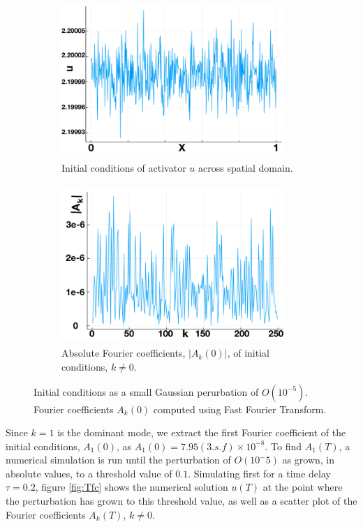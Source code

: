 \documentclass[12pt]{report}
\begin{document}
\begin{figure}[H]
    \centering
    \begin{subfigure}[b]{0.45\textwidth}
        \centering
        \includegraphics[width=8.5cm,height=6cm]{uic.png}
        \caption{Initial conditions of activator $u$ across spatial domain.}
        \label{}
    \end{subfigure}
    \hfill
    \begin{subfigure}[b]{0.45\textwidth}
        \centering
        \includegraphics[width=8.5cm,height=6cm]{uicfc.png}
        \caption{Absolute Fourier coefficients, $|A_k(0)|$, of initial conditions, $k\neq0$.}
        \label{fig:}
    \end{subfigure}
    \caption{Initial conditions as a small Gaussian perurbation of $O(10^{-5})$. Fourier coefficients $A_k(0)$ computed using Fast Fourier Transform.}
    \label{fig:icfc}
\end{figure}
Since $k=1$ is the dominant mode, we extract the first Fourier coefficient of the initial conditions, $A_1(0)$, as $A_1(0)=7.95(3.s.f)\times10^{-8}$. To find $A_1(T)$, a numerical simulation is run until the perturbation of $O(10^-5)$ as grown, in absolute values, to a threshold value of $0.1$. Simulating first for a time delay $\tau=0.2$, figure \ref{fig:Tfc} shows the numerical solution $u(T)$ at the point where the perturbation has grown to this threshold value, as well as a scatter plot of the Fourier coefficients $A_k(T)$, $k\neq0$.
\end{document}
